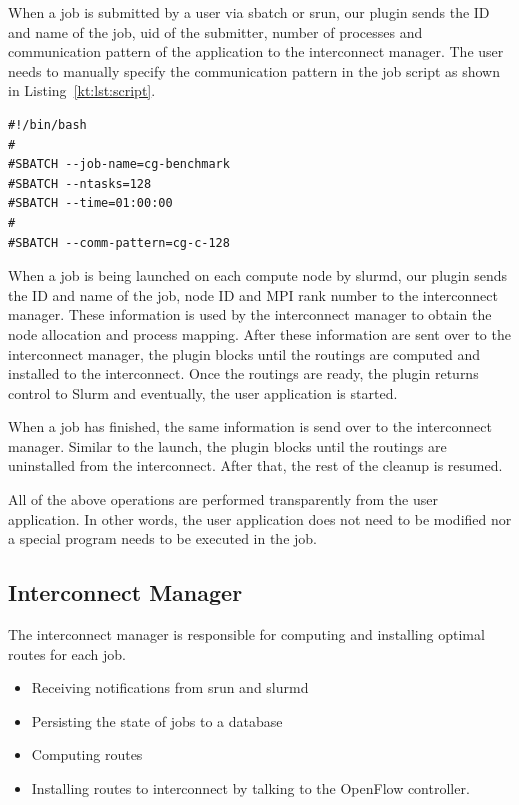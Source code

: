 \documentclass[graybox]{svmult}
\begin{document}
When a job is submitted by a user via sbatch or srun, our plugin sends the ID
and name of the job, uid of the submitter, number of processes and
communication pattern of the application to the interconnect manager. The user
needs to manually specify the communication pattern in the job script as shown
in Listing~\ref{kt:lst:script}.

\begin{lstlisting}[float,caption=An example of a job script,label=kt:lst:script]
#!/bin/bash
#
#SBATCH --job-name=cg-benchmark
#SBATCH --ntasks=128
#SBATCH --time=01:00:00
#
#SBATCH --comm-pattern=cg-c-128
\end{lstlisting}

When a job is being launched on each compute node by slurmd, our plugin sends
the ID and name of the job, node ID and MPI rank number to the interconnect
manager. These information is used by the interconnect manager to obtain the
node allocation and process mapping. After these information are sent over to
the interconnect manager, the plugin blocks until the routings are computed
and installed to the interconnect. Once the routings are ready, the plugin
returns control to Slurm and eventually, the user application is started.

When a job has finished, the same information is send over to the interconnect
manager. Similar to the launch, the plugin blocks until the routings are
uninstalled from the interconnect. After that, the rest of the cleanup is
resumed.

All of the above operations are performed transparently from the user
application. In other words, the user application does not need to be modified
nor a special program needs to be executed in the job.

\subsection{Interconnect Manager}

The interconnect manager is responsible for computing and installing optimal
routes for each job.

\begin{itemize}
    \item Receiving notifications from srun and slurmd
    \item Persisting the state of jobs to a database
    \item Computing routes
    \item Installing routes to interconnect by talking to the OpenFlow
        controller.
\end{itemize}
\end{document}
